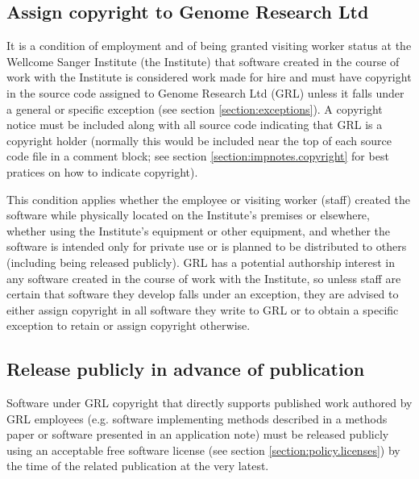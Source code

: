 \documentclass[10pt,a4paper]{article}
\begin{document}
\subsection{Assign copyright to Genome Research Ltd}
\label{section:policy.copyright}
\par It is a condition of employment and of being granted visiting worker status 
at the Wellcome Sanger Institute (the Institute) that software created in the 
course of work with the Institute is considered work made for hire and must have 
copyright in the source code assigned to Genome Research Ltd (GRL) unless it 
falls under a general or specific exception (see section \ref{section:exceptions}). 
A copyright notice must be included along with all source code indicating that 
GRL is a copyright holder (normally this would be included near the top of each 
source code file in a comment block; see section \ref{section:impnotes.copyright} 
for best pratices on how to indicate copyright). 

\par This condition applies whether the employee or visiting worker (staff) 
created the software while physically located on the Institute's premises or 
elsewhere, whether using the Institute's equipment or other equipment, and 
whether the software is intended only for private use or is planned to be 
distributed to others (including being released publicly). GRL has a potential 
authorship interest in any software created in the course of work with the 
Institute, so unless staff are certain that software they develop falls 
under an exception, they are advised to either assign copyright in all software 
they write to GRL or to obtain a specific exception to retain or assign copyright 
otherwise.


\subsection{Release publicly in advance of publication}

\par Software under GRL copyright that directly supports published work authored 
by GRL employees (e.g. software implementing methods described in a methods 
paper or software presented in an application note) must be released publicly 
using an acceptable free software license (see section \ref{section:policy.licenses}) 
by the time of the related publication at the very latest. 
\end{document}
